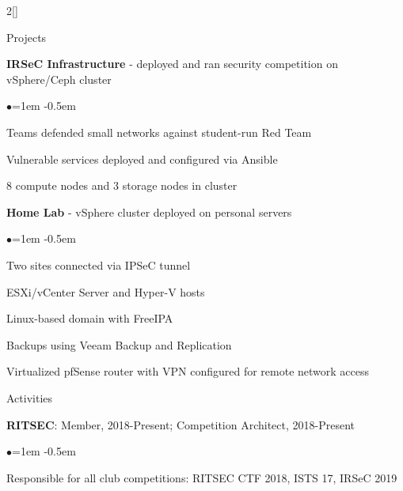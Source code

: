 \documentclass[8pt]{resume} %
\begin{document}
\begin{multicols}{2}[]


\begin{rSection}{Projects}

    {\bf IRSeC Infrastructure} - deployed and ran security competition on
    vSphere/Ceph cluster
    \begin{list}{$\bullet$}{\leftmargin=1em}
    \itemsep -0.5em \vspace{-0.5em}
        \item Teams defended small networks against student-run Red Team
        \item Vulnerable services deployed and configured via Ansible
        \item 8 compute nodes and 3 storage nodes in cluster
    \end{list}


    {\bf Home Lab} - vSphere cluster deployed on personal servers
    \begin{list}{$\bullet$}{\leftmargin=1em}
    \itemsep -0.5em \vspace{-0.5em}
        \item Two sites connected via IPSeC tunnel
        \item ESXi/vCenter Server and Hyper-V hosts
        \item Linux-based domain with FreeIPA
        \item Backups using Veeam Backup and Replication
        \item Virtualized pfSense router with VPN configured for remote network
            access
    \end{list}

\end{rSection}

\columnbreak


\begin{rSection}{Activities}

    {\bf RITSEC}: Member, 2018-Present; Competition Architect, 2018-Present
    \begin{list}{$\bullet$}{\leftmargin=1em}
    \itemsep -0.5em \vspace{-0.5em}
    \item Responsible for all club competitions: RITSEC CTF 2018, ISTS 17,
        IRSeC 2019
    \end{list}


\end{rSection}
\end{multicols}
\end{document}
